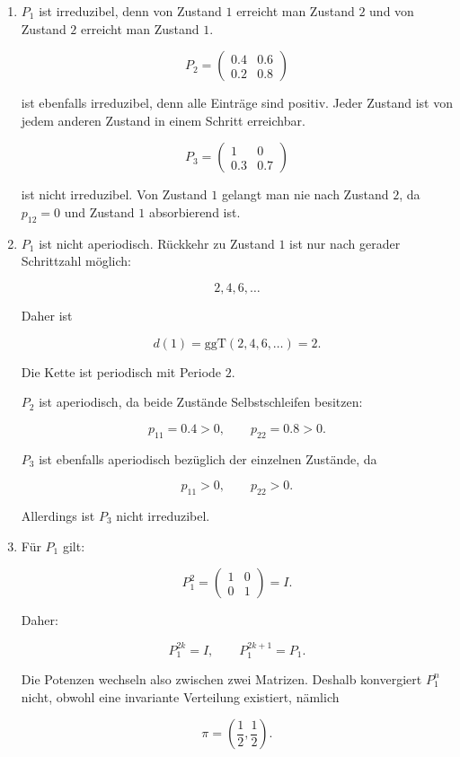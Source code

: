 \documentclass[11pt,a4paper]{article}
\begin{document}
\begin{enumerate}
    \item $P_1$ ist irreduzibel, denn von Zustand $1$ erreicht man Zustand $2$ und von Zustand $2$ erreicht man Zustand $1$.

    \[
    P_2 =
    \begin{pmatrix}
    0.4 & 0.6 \\
    0.2 & 0.8
    \end{pmatrix}
    \]

    ist ebenfalls irreduzibel, denn alle Einträge sind positiv. Jeder Zustand ist von jedem anderen Zustand in einem Schritt erreichbar.

    \[
    P_3 =
    \begin{pmatrix}
    1 & 0 \\
    0.3 & 0.7
    \end{pmatrix}
    \]

    ist nicht irreduzibel. Von Zustand $1$ gelangt man nie nach Zustand $2$, da $p_{12}=0$ und Zustand $1$ absorbierend ist.

    \item $P_1$ ist nicht aperiodisch. Rückkehr zu Zustand $1$ ist nur nach gerader Schrittzahl möglich:

    \[
    2,4,6,\dots
    \]

    Daher ist

    \[
    d(1)=\mathrm{ggT}(2,4,6,\dots)=2.
    \]

    Die Kette ist periodisch mit Periode $2$.

    $P_2$ ist aperiodisch, da beide Zustände Selbstschleifen besitzen:

    \[
    p_{11}=0.4>0,
    \qquad
    p_{22}=0.8>0.
    \]

    $P_3$ ist ebenfalls aperiodisch bezüglich der einzelnen Zustände, da

    \[
    p_{11}>0,
    \qquad
    p_{22}>0.
    \]

    Allerdings ist $P_3$ nicht irreduzibel.

    \item Für $P_1$ gilt:

    \[
    P_1^2=
    \begin{pmatrix}
    1 & 0 \\
    0 & 1
    \end{pmatrix}
    =I.
    \]

    Daher:

    \[
    P_1^{2k}=I,
    \qquad
    P_1^{2k+1}=P_1.
    \]

    Die Potenzen wechseln also zwischen zwei Matrizen. Deshalb konvergiert $P_1^n$ nicht, obwohl eine invariante Verteilung existiert, nämlich

    \[
    \pi=
    \left(
    \frac12,\frac12
    \right).
    \]
\end{enumerate}
\end{document}
